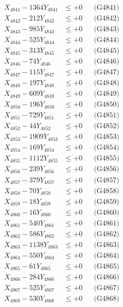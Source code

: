 \documentclass[a4paper,10pt]{article}
\begin{document}
{\begin{align}
\allowbreak
X_{4841} - 1364Y_{4841} &\leq +0 && \text{(G4841)} \\
X_{4842} - 212Y_{4842} &\leq +0 && \text{(G4842)} \\
X_{4843} - 985Y_{4843} &\leq +0 && \text{(G4843)} \\
X_{4844} - 525Y_{4844} &\leq +0 && \text{(G4844)} \\
X_{4845} - 313Y_{4845} &\leq +0 && \text{(G4845)} \\
X_{4846} - 74Y_{4846} &\leq +0 && \text{(G4846)} \\
X_{4847} - 115Y_{4847} &\leq +0 && \text{(G4847)} \\
X_{4848} - 197Y_{4848} &\leq +0 && \text{(G4848)} \\
X_{4849} - 609Y_{4849} &\leq +0 && \text{(G4849)} \\
X_{4850} - 196Y_{4850} &\leq +0 && \text{(G4850)} \\
\allowbreak
X_{4851} - 729Y_{4851} &\leq +0 && \text{(G4851)} \\
X_{4852} - 44Y_{4852} &\leq +0 && \text{(G4852)} \\
X_{4853} - 1909Y_{4853} &\leq +0 && \text{(G4853)} \\
X_{4854} - 169Y_{4854} &\leq +0 && \text{(G4854)} \\
X_{4855} - 1112Y_{4855} &\leq +0 && \text{(G4855)} \\
X_{4856} - 239Y_{4856} &\leq +0 && \text{(G4856)} \\
X_{4857} - 379Y_{4857} &\leq +0 && \text{(G4857)} \\
X_{4858} - 70Y_{4858} &\leq +0 && \text{(G4858)} \\
X_{4859} - 18Y_{4859} &\leq +0 && \text{(G4859)} \\
X_{4860} - 16Y_{4860} &\leq +0 && \text{(G4860)} \\
\allowbreak
X_{4861} - 540Y_{4861} &\leq +0 && \text{(G4861)} \\
X_{4862} - 586Y_{4862} &\leq +0 && \text{(G4862)} \\
X_{4863} - 1138Y_{4863} &\leq +0 && \text{(G4863)} \\
X_{4864} - 550Y_{4864} &\leq +0 && \text{(G4864)} \\
X_{4865} - 61Y_{4865} &\leq +0 && \text{(G4865)} \\
X_{4866} - 284Y_{4866} &\leq +0 && \text{(G4866)} \\
X_{4867} - 525Y_{4867} &\leq +0 && \text{(G4867)} \\
X_{4868} - 530Y_{4868} &\leq +0 && \text{(G4868)} \\

\end{align}}
\end{document}
